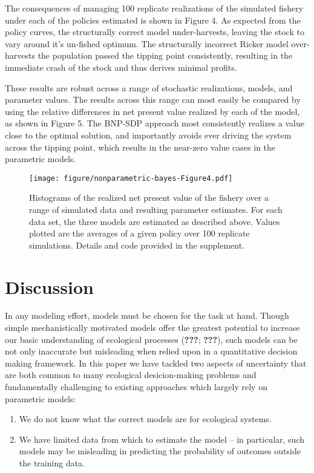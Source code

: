 \documentclass[author-year, review]{elsarticle} %
\makeatletter
\def\maxwidth{\ifdim\Gin@nat@width>\linewidth\linewidth
\else\Gin@nat@width\fi}
\let\Oldincludegraphics\includegraphics
\renewcommand{\includegraphics}[1]{\Oldincludegraphics[width=\maxwidth]{#1}}
\makeatother
\begin{document}
The consequences of managing 100 replicate realizations of the simulated
fishery under each of the policies estimated is shown in Figure 4. As
expected from the policy curves, the structurally correct model
under-harvests, leaving the stock to vary around it's un-fished optimum.
The structurally incorrect Ricker model over-harvests the population
passed the tipping point consistently, resulting in the immediate crash
of the stock and thus derives minimal profits.

These results are robust across a range of stochastic realizations,
models, and parameter values. The results across this range can most
easily be compared by using the relative differences in net present
value realized by each of the model, as shown in Figure 5. The BNP-SDP
approach most consistently realizes a value close to the optimal
solution, and importantly avoids ever driving the system across the
tipping point, which results in the near-zero value cases in the
parametric models.

\begin{figure}[htbp]
\centering
\texttt{[image: figure/nonparametric-bayes-Figure4.pdf]}
\caption{Histograms of the realized net present value of the fishery
over a range of simulated data and resulting parameter estimates. For
each data set, the three models are estimated as described above. Values
plotted are the averages of a given policy over 100 replicate
simulations. Details and code provided in the supplement.}
\end{figure}

\section{Discussion}\label{discussion}

In any modeling effort, models must be chosen for the task at hand.
Though simple mechanistically motivated models offer the greatest
potential to increase our basic understanding of ecological processes
({\textbf{???}}; {\textbf{???}}), such models can be not only inaccurate
but misleading when relied upon in a quantitative decision making
framework. In this paper we have tackled two aspects of uncertainty that
are both common to many ecological desicion-making problems and
fundamentally challenging to existing approaches which largely rely on
parametric models:

\begin{enumerate}
\def\labelenumi{\arabic{enumi}.}
\itemsep1pt\parskip0pt
\item
  We do not know what the correct models are for ecological systems.
\item
  We have limited data from which to estimate the model -- in
  particular, such models may be misleading in predicting the
  probability of outcomes outside the training data.
\end{enumerate}
\end{document}
